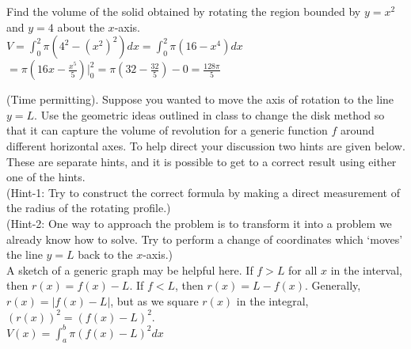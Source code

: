 \documentclass{ximera}
\begin{document}
\begin{exercise}
    Find the volume of the solid obtained by rotating the region bounded by $y=x^2$ and $y=4$ about the $x$-axis.  \\
    {\color{blue} $V=\displaystyle \int_0^2\pi(4^2-(x^2)^2)dx=\int_0^2\pi(16-x^4)dx$\\
    $=\pi(16x-\frac{x^5}{5})\bigg|_0^2=\pi(32-\frac{32}{5})-0=\frac{128\pi}{5}$}
\end{exercise}

\begin{exercise}
    (Time permitting). Suppose you wanted to move the axis of rotation to the line $y=L$. Use the geometric ideas outlined in class to change the disk method so that it can capture the volume of revolution for a generic function $f$ around different horizontal axes. To help direct your discussion two hints are given below. These are separate hints, and it is possible to get to a correct result using either one of the hints.\\


    (Hint-1: Try to construct the correct formula by making a direct measurement of the radius of the rotating profile.)\\

    (Hint-2: One way to approach the problem is to transform it into a problem we already know how to solve. Try to perform a change of coordinates which `moves' the line $y=L$ back to the $x$-axis.)\\
    
    {\color{blue} A sketch of a generic graph may be helpful here. If $f>L$ for all $x$ in the interval, then $r(x)=f(x)-L$.  If $f<L$, then $r(x)=L-f(x)$.  Generally, $r(x)=|f(x)-L|$, but as we square $r(x)$ in the integral, $(r(x))^2=(f(x)-L)^2$.\\
    $V(x)=\displaystyle \int_a^b \pi (f(x)-L)^2dx $}

\end{exercise}
\end{document}
